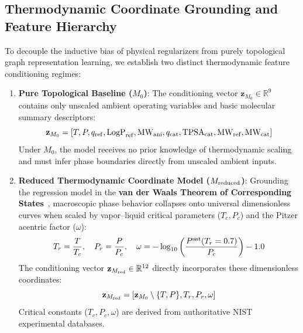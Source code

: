 \subsection{Thermodynamic Coordinate Grounding and Feature Hierarchy}
\label{subsec:thermo_hierarchy}

To decouple the inductive bias of physical regularizers from purely topological graph representation learning, we establish two distinct thermodynamic feature conditioning regimes:

\begin{enumerate}
    \item \textbf{Pure Topological Baseline ($M_0$)}: 
    The conditioning vector $\mathbf{z}_{M_0} \in \mathbb{R}^{9}$ contains only unscaled ambient operating variables and basic molecular summary descriptors:
    \begin{equation}
        \mathbf{z}_{M_0} = \left[T, P, q_{\rm ref}, \text{LogP}_{\rm ref}, \text{MW}_{\rm ani}, q_{\rm cat}, \text{TPSA}_{\rm cat}, \text{MW}_{\rm ref}, \text{MW}_{\rm cat}\right]
    \end{equation}
    Under $M_0$, the model receives no prior knowledge of thermodynamic scaling and must infer phase boundaries directly from unscaled ambient inputs.

    \item \textbf{Reduced Thermodynamic Coordinate Model ($M_{\rm reduced}$)}: 
    Grounding the regression model in the \textbf{van der Waals Theorem of Corresponding States}~\cite{Pitzer1955_Acentric,Prausnitz1998_FluidPhase,Kocis2020_PINN_Thermo}, macroscopic phase behavior collapses onto universal dimensionless curves when scaled by vapor--liquid critical parameters ($T_c, P_c$) and the Pitzer acentric factor ($\omega$):
    \begin{equation}
        T_r = \frac{T}{T_c}, \quad P_r = \frac{P}{P_c}, \quad \omega = -\log_{10}\left(\frac{P^{\rm sat}(T_r = 0.7)}{P_c}\right) - 1.0
    \end{equation}
    The conditioning vector $\mathbf{z}_{M_{\rm red}} \in \mathbb{R}^{12}$ directly incorporates these dimensionless coordinates:
    \begin{equation}
        \mathbf{z}_{M_{\rm red}} = \left[\mathbf{z}_{M_0} \setminus \{T, P\}, T_r, P_r, \omega\right]
    \end{equation}
    Critical constants ($T_c, P_c, \omega$) are derived from authoritative NIST experimental databases.
\end{enumerate}

